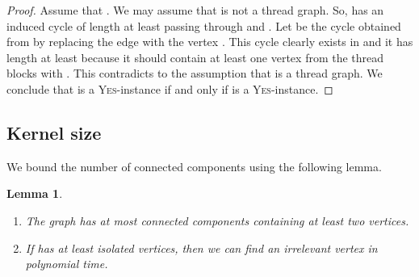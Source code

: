 \documentclass[11pt]{article}
\newtheorem{lemma}[theorem]{Lemma}
\theoremstyle{remark}
\begin{document}
\begin{proof}
Assume that . 
We may assume that  is not a thread graph.
So,  has an induced cycle  of length at least  passing through  and .
Let  be the cycle obtained from  by replacing the edge  with the vertex .
This cycle  clearly exists in  and it has length at least  because it should contain at least one vertex from the thread blocks  with .
This contradicts to the assumption that  is a thread graph.
We conclude that  is a \textsc{Yes}-instance if and only if  is a \textsc{Yes}-instance.
\end{proof}

\subsection{Kernel size}\label{subsec:kernelsize}


We bound the number of connected components using the following lemma.


\begin{lemma}\label{lem:reducecomponent1}
\begin{enumerate}[(1)]
\item The graph  has at most  connected components containing at least two vertices.
\item If  has at least  isolated vertices,
then we can find an irrelevant vertex in polynomial time.
\end{enumerate}
\end{lemma}
\end{document}
